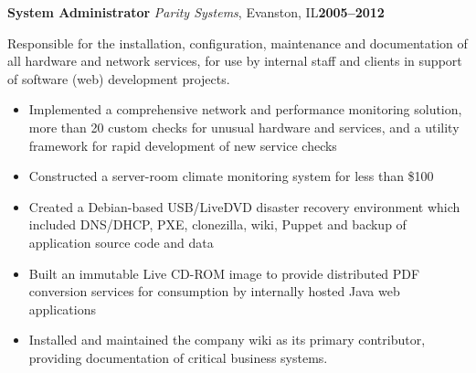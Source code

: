 \documentclass[10pt,letterpaper]{article}
\newcommand{\cventry}[5]{%
{\bfseries{#2}} {\small{\textit{#3}, #4}}\hfill {\small\bfseries{#1}}
\begin{small}\begin{adjustwidth}{1em}{2em}{\raggedright{#5}}\end{adjustwidth}\end{small}
}
\begin{document}
\cventry{2005--2012}{System Administrator}{Parity Systems}{Evanston, IL}{%
{Responsible for the installation, configuration, maintenance and documentation
of all hardware and network services, for use by internal staff and clients
in support of software (web) development projects.}

\begin{itemize}
\item Implemented a comprehensive network and performance monitoring solution,
more than 20 custom checks for unusual hardware and services, and a utility
framework for rapid development of new service checks
\item Constructed a server-room climate monitoring system for less than \$100
\item Created a Debian-based USB/LiveDVD disaster recovery environment which
      included DNS/DHCP, PXE, clonezilla, wiki, Puppet and backup of
      application source code and data
\item Built an immutable Live CD-ROM image to provide distributed
      PDF conversion services for consumption by internally hosted Java web
      applications
\item Installed and maintained the company wiki as its primary contributor,
      providing documentation of critical business systems.
\end{itemize}
}
\end{document}
